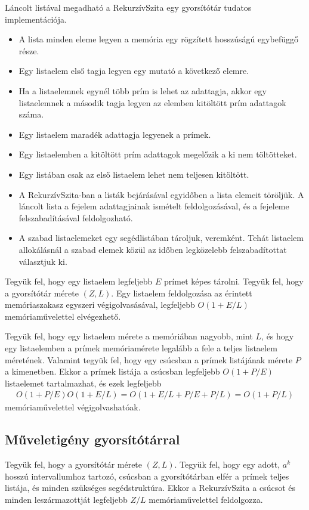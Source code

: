 \documentclass[12pt]{report}
\begin{document}
Láncolt listával megadható a RekurzívSzita egy gyorsítótár tudatos
implementációja.
\begin{itemize}
\item A lista minden eleme legyen a memória egy rögzített hosszúságú
egybefüggő része.
\item Egy listaelem első tagja legyen egy mutató a következő elemre.
\item Ha a listaelemnek egynél több prím is lehet az adattagja,
akkor egy listaelemnek a második tagja legyen
az elemben kitöltött prím adattagok száma.
\item Egy listaelem maradék adattagja legyenek a prímek.
\item Egy listaelemben a kitöltött prím adattagok megelőzik
a ki nem töltötteket.
\item Egy listában csak az első listaelem lehet nem teljesen kitöltött.
\item A RekurzívSzita-ban a listák bejárásával egyidőben a lista elemeit töröljük.
A láncolt lista a fejelem adattagjainak ismételt feldolgozásával,
és a fejeleme felszabadításával feldolgozható.
\item A szabad listaelemeket egy segédlistában tároljuk, veremként.
Tehát listaelem allokálásnál a szabad elemek közül az időben
legközelebb felszabadítottat választjuk ki.
\end{itemize}

Tegyük fel, hogy egy listaelem legfeljebb $E$ prímet képes tárolni.
Tegyük fel, hogy a gyorsítótár mérete $(Z, L)$.
Egy listaelem feldolgozása az érintett memóriaszakasz egyszeri végigolvasásával,
legfeljebb $O(1+E/L)$ memóriaművelettel elvégezhető.

Tegyük fel, hogy egy listaelem mérete a memóriában nagyobb, mint $L$,
és hogy egy listaelemben a prímek memóriamérete legalább a fele
a teljes listaelem méretének.
Valamint tegyük fel, hogy egy csúcsban a prímek listájának mérete $P$ a kimenetben.
Ekkor a prímek listája a csúcsban legfeljebb $O(1+P/E)$ listaelemet tartalmazhat,
és ezek legfeljebb
\begin{align*}
O(1+P/E)O(1+E/L) = O(1+E/L+P/E+P/L) = O(1+P/L)
\end{align*}
memóriaművelettel végigolvashatóak.

\subsection{Műveletigény gyorsítótárral}

Tegyük fel, hogy a gyorsítótár mérete $(Z, L)$.
Tegyük fel, hogy egy adott, $a^k$ hosszú intervallumhoz tartozó, csúcsban
a gyorsítótárban elfér a prímek teljes listája,
és minden szükséges segédstruktúra.
Ekkor a RekurzívSzita a csúcsot és minden leszármazottját
legfeljebb $Z/L$ memóriaművelettel feldolgozza.
\end{document}
